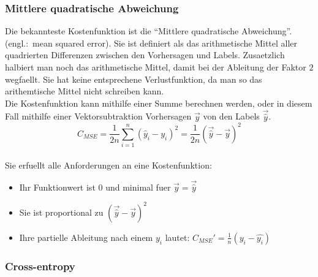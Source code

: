 \subsubsection{Mittlere quadratische Abweichung}
Die bekannteste Kostenfunktion ist die ``Mittlere quadratische Abweichung''.
(engl.:\ mean squared error). Sie ist definiert als das arithmetische Mittel
aller quadrierten Differenzen zwischen den Vorhersagen und Labels.
Zusaetzlich halbiert man noch das arithmetische Mittel, damit bei der Ableitung der Faktor
$2$ wegfaellt. Sie hat keine entsprechene Verlustfunktion, da man so das
arithemtische Mittel nicht schreiben kann.
\\
Die Kostenfunktion kann mithilfe einer Summe berechnen werden, oder in
diesem Fall mithilfe einer Vektorsubtraktion Vorhersagen $\vec{y}$ von den Labels $\vec{\hat{y}}$.
\\
\begin{equation}\label{eq:MSE}
  C_{MSE} = \frac{1}{2n}\sum_{i=1}^{n}{(\hat{y}_i - y_i)}^2 = \frac{1}{2n}{(\vec{\hat{y}} - \vec{y})}^2
\end{equation}
\\
Sie erfuellt alle Anforderungen an eine Kostenfunktion:
\begin{itemize}
\item{Ihr Funktionwert ist 0 und minimal fuer $\vec{y} = \vec{\hat{y}}$}
\item{Sie ist proportional zu ${(\vec{\hat{y}}-\vec{y})}^2$}
\item{Ihre partielle Ableitung nach einem $y_i$ lautet: $C_{MSE}'=\frac{1}{n}(y_i-\hat{y_i})$}
\end{itemize}


\subsubsection{Cross-entropy}


